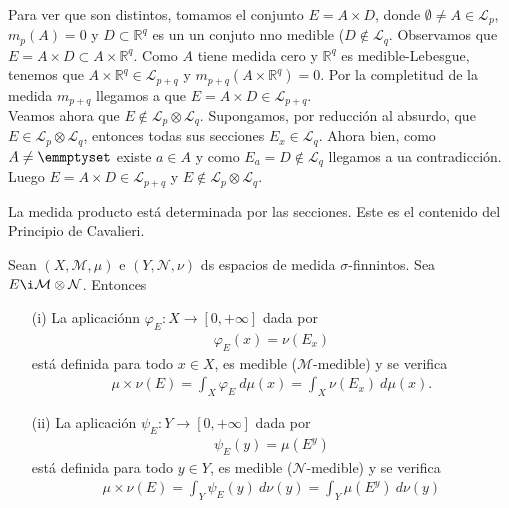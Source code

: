 \begin{obs}
\\
\newline
Para ver que son distintos, tomamos el conjunto $E = A \times D$, donde $\emptyset \not = A \in \mathcal{L}_p$, $m_p(A) = 0$ y $D \subset \mathbb{R}^q$ es un un conjuto nno medible ($D \not \in \mathcal{L}_q$. Observamos que $E = A \times D \subset A \times \mathbb{R}^q$. Como $A$ tiene medida cero y $\mathbb{R}^q$ es medible-Lebesgue, tenemos que $A \times \mathbb{R}^q \in \mathcal{L}_{p+q}$ y $m_{p+q}(A \times \mathbb{R}^q) = 0$. Por la completitud de la medida $m_{p+q}$ llegamos a que $E = A \times D \in \mathcal{L}_{p+q}$.
\\
\newline
Veamos ahora que $E \not \in \mathcal{L}_p \otimes \mathcal{L}_q$. Supongamos, por reducción al absurdo, que $E \in \mathcal{L}_p \otimes \mathcal{L}_q$, entonces todas sus secciones $E_x \in \mathcal{L}_q$. Ahora bien, como $A \not = \emmptyset$ existe $a \in A$ y como $E_a = D \not \in \mathcal{L}_q$ llegamos a ua contradicción. Luego $E = A \times D \in \mathcal{L}_{p+q}$ y $E \not \in \mathcal{L}_p \otimes \mathcal{L}_q$.
\end{obs}
La medida producto está determinada por las secciones. Este es el contenido del Principio de Cavalieri.

\begin{teo}
Sean $(X, \mathcal{M}, \mu)$ e $(Y, \mathcal{N}, \nu)$ ds espacios de medida $\sigma$-finnintos. Sea $E \i \mathcal{M} \otimes \mathcal{N}$. Entonces
\begin{enumerate}
    \item[(i)] La aplicaciónn $\varphi_E : X \longrightarrow [0,+\infty]$ dada por
    \begin{align*}
        \varphi_E(x) = \nu(E_x)
    \end{align*}
    está definida para todo $x \in X$, es medible ($\mathcal{M}$-medible) y se verifica
    \begin{align*}
        \mu \times \nu (E) = \int_{X}{\varphi_E \ d\mu(x)} = \int_{X}{\nu(E_x) \ d\mu(x)}.
    \end{align*}
    \item[(ii)] La aplicación $\psi_E : Y \longrightarrow [0,+\infty]$ dada por
    \begin{align*}
        \psi_E(y) = \mu(E^y)
    \end{align*}
    está definida para todo $y \in Y$, es medible ($\mathcal{N}$-medible) y se verifica
    \begin{align*}
        \mu \times \nu (E) = \int_{Y}{\psi_E(y) \ d\nu(y)} = \int_{Y}{\mu(E^y) \ d\nu(y)}
    \end{align*}
\end{enumerate}
\end{teo}

